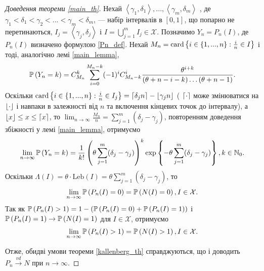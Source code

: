 \begin{proof}[Доведення теореми \ref{main_th}]\label{main_proof}
    Нехай $\left<\gamma_1, \delta_1 \right>, ..., \left<\gamma_m, \delta_m \right>$ ,
    де $\gamma_1 < \delta_1 < \gamma_2 < ... < \gamma_m < \delta_m$, --- 
    набір інтервалів в $[0, 1]$, що попарно не перетинаються, 
    $I_j = \left<\gamma_j, \delta_j\right>$ і $I = \bigcup_{j=1}^m I_j \in \mathcal{X}$.
    Позначимо $Y_n = P_n (I)$, де $P_n(I)$ визначено формулою \eqref{Pn_def}.
    Нехай $M_n = \card \left\{ 
        i \in \{1, ..., n\} : \frac{i}{n} \in I
    \right\}$ і тоді, аналогічно лемі \ref{main_lemma},
    \begin{gather*}
        \P{Y_n = k} = C_{M_n}^k \sum_{i=0}^{M_n-k}(-1)^{i} C_{M_n-k}^{i} \frac{\theta^{i+k}}{
            (\theta + n - i - k) \dots (\theta + n - 1)
        }.
    \end{gather*}
    Оскільки 
    $\card \left\{ 
        i \in \{1, ..., n\} : \frac{i}{n} \in I_j
    \right\} = \ceil*{\delta_j n} - \floor*{\gamma_j n}$ (
        $\ceil*{\cdot}$ може змінюватися на $\floor*{\cdot}$ і навпаки
        в залежності від $n$ та включення кінцевих точок до інтервалу), а $\floor*{x} \leq x \leq \ceil*{x}$, то
    $\lim_{n\to\infty}\frac{M_n}{n} = \sum_{j=1}^m (\delta_j - \gamma_j)$,
    повторенням доведення збіжності у лемі \ref{main_lemma},
    отримуємо
    \begin{gather*}
            \lim_{n\to\infty}\P{Y_n = k} = 
            \frac{1}{k!} \left(
                \theta \sum_{j=1}^m (\delta_j - \gamma_j)
            \right)^k
            \exp\left\{ 
                -\theta \sum_{j=1}^m (\delta_j - \gamma_j)
            \right\}, k \in \N_0.
    \end{gather*}
    Оскільки $\Lambda(I) = \theta \cdot \mathrm{Leb}(I) = \theta \sum_{j=1}^m (\delta_j - \gamma_j)$,
    то
    \begin{gather*}
        \lim_{n\to\infty}\P{P_n(I) = 0} = \P{N(I) = 0}, I\in\mathcal{X}.
    \end{gather*}
    Так як $\P{P_n(I) > 1} = 1 - \left(
        \P{P_n(I) = 0} + \P{P_n(I) = 1}
    \right)$ і $\P{P_n(I) = 1} \to \P{N(I) = 1}$ для $I\in\mathcal{X}$,
    отримуємо 
    \begin{gather*}
        \lim_{n\to\infty}\P{P_n(I) > 1} = \P{N(I) > 1}, I\in\mathcal{X}.
    \end{gather*}

    Отже, обидві умови теореми \ref{kallenberg_th} справджуються, що і доводить
    $P_n \overset{vd}{\longrightarrow} N$ при $n\to\infty$.
\end{proof}

